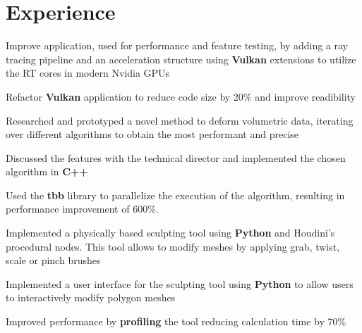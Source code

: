 \documentclass[]{deedy-resume-openfont}
\begin{document}
\begin{minipage}[t]{0.66\textwidth} 


\section{Experience}
\vspace{\topsep} %
\begin{tightemize}
    \item Improve application, used for performance and feature testing, by adding a ray tracing pipeline and an acceleration structure using \textbf{Vulkan} extensions to utilize the RT cores in modern Nvidia GPUs 
    \item Refactor \textbf{Vulkan} application to reduce code size by 20\% and improve readibility
\end{tightemize}
\sectionsep
{} 
\begin{tightemize}
    \item Researched and prototyped a novel method to deform volumetric data, iterating over different algorithms to obtain the most performant and precise
    \item Discussed the features with the technical director and implemented the chosen algorithm in \textbf{C++}
    \item Used  the \textbf{tbb} library to parallelize the execution of the algorithm, resulting in performance improvement of 600\%.
\end{tightemize}
\begin{tightemize}
    \item Implemented a physically based sculpting tool using \textbf{Python} and Houdini's procedural nodes. This tool allows to modify meshes by applying grab, twist, scale or pinch brushes
    \item Implemented a user interface for the sculpting tool using \textbf{Python} to allow users to interactively modify polygon meshes
    \item Improved performance by \textbf{profiling} the tool reducing calculation time by 70\%
\end{tightemize}
\sectionsep


\end{minipage}
\end{document}
